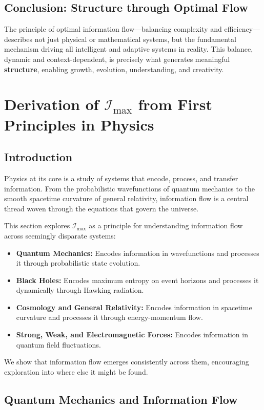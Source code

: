 \documentclass[12pt]{article}
\begin{document}
\subsection{Conclusion: Structure through Optimal Flow}
The principle of optimal information flow—balancing complexity and efficiency—describes not just physical or mathematical systems, but the fundamental mechanism driving all intelligent and adaptive systems in reality. This balance, dynamic and context-dependent, is precisely what generates meaningful \textbf{structure}, enabling growth, evolution, understanding, and creativity.


\section{Derivation of \(\mathcal{I}_{\text{max}}\) from First Principles in Physics}


\subsection{Introduction}

Physics at its core is a study of systems that encode, process, and transfer information. From the probabilistic wavefunctions of quantum mechanics to the smooth spacetime curvature of general relativity, information flow is a central thread woven through the equations that govern the universe. 

This section explores \(\mathcal{I}_{\text{max}}\) as a principle for understanding information flow across seemingly disparate systems:
\begin{itemize}
    \item \textbf{Quantum Mechanics:} Encodes information in wavefunctions and processes it through probabilistic state evolution.
    \item \textbf{Black Holes:} Encodes maximum entropy on event horizons and processes it dynamically through Hawking radiation.
    \item \textbf{Cosmology and General Relativity:} Encodes information in spacetime curvature and processes it through energy-momentum flow.
    \item \textbf{Strong, Weak, and Electromagnetic Forces:} Encodes information in quantum field fluctuations.
\end{itemize}
We show that information flow emerges consistently across them, encouraging exploration into where else it might be found.

\subsection{Quantum Mechanics and Information Flow}
\end{document}
